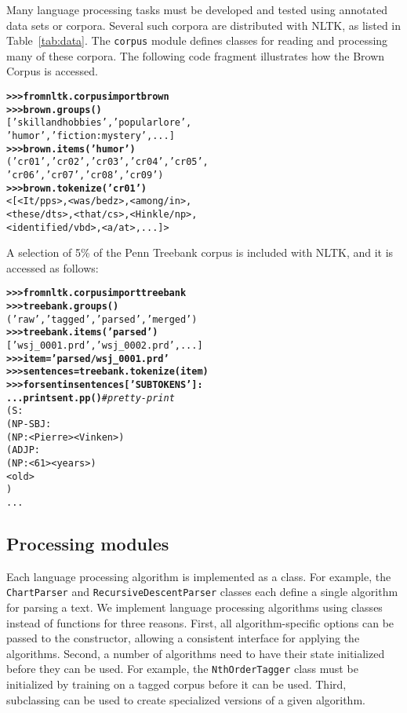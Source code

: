 \documentclass[11pt]{article}
\def\object#1{\texttt{\small #1}}
\begin{document}
Many language processing tasks must be developed and tested using
annotated data sets or corpora.  Several such corpora are distributed
with NLTK, as listed in Table~\ref{tab:data}.  The
\object{corpus} module defines classes for reading and processing
many of these corpora.  The following code fragment illustrates
how the Brown Corpus is accessed.

\begin{alltt}\small
\textbf{>>> from nltk.corpus import brown}
\textbf{>>> brown.groups()}
['skill and hobbies', 'popular lore', 
'humor', 'fiction: mystery', ...]
\textbf{>>> brown.items('humor')}
('cr01', 'cr02', 'cr03', 'cr04', 'cr05',
'cr06', 'cr07', 'cr08', 'cr09')
\textbf{>>> brown.tokenize('cr01')}
<[<It/pps>, <was/bedz>, <among/in>,
<these/dts>, <that/cs>, <Hinkle/np>,
<identified/vbd>, <a/at>, ...]>
\end{alltt}
%
A selection of 5\% of the Penn Treebank corpus is included with
NLTK, and it is accessed as follows:

\begin{alltt}\small
\textbf{>>> from nltk.corpus import treebank}
\textbf{>>> treebank.groups()}
('raw', 'tagged', 'parsed', 'merged')
\textbf{>>> treebank.items('parsed')}
['wsj_0001.prd', 'wsj_0002.prd', ...]
\textbf{>>> item = 'parsed/wsj_0001.prd'}
\textbf{>>> sentences = treebank.tokenize(item)}
\textbf{>>> for sent in sentences['SUBTOKENS']:}
\textbf{...     print sent.pp()} \emph{# pretty-print}
(S:
  (NP-SBJ:
    (NP: <Pierre> <Vinken>)
    (ADJP:
      (NP: <61> <years>)
      <old>
    )
    ...
\end{alltt}
%

\subsection{Processing modules}

Each language processing algorithm is implemented as a class.  For
example, the \object{ChartParser} and
\object{Recursive\-Descent\-Parser} classes each define a single
algorithm for parsing a text.  We implement language processing
algorithms using classes instead of functions for three reasons.
First, all algorithm-specific options can be passed to the
constructor, allowing a consistent interface for applying the
algorithms.  Second, a number of algorithms need to have their state
initialized before they can be used.  For example, the
\object{NthOrderTagger} class must be initialized by training on a
tagged corpus before it can be used.  Third, subclassing can be used
to create specialized versions of a given algorithm.
\end{document}
